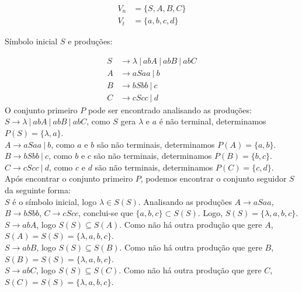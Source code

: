 \documentclass{article}
\begin{document}
\begin{align*}
    V_n &= \{S, A, B, C\}\\
    V_t &= \{a, b, c, d\}
\end{align*}

\noindent Símbolo inicial $S$ e produções:

\begin{align*}
    S &\rightarrow \lambda\ |\ abA\ |\ abB\ |\ abC\\
    A &\rightarrow aSaa\ |\ b\\
    B &\rightarrow bSbb\ |\ c\\
    C &\rightarrow cScc\ |\ d
\end{align*}
O conjunto primeiro $P$ pode ser encontrado analisando as produções:\\
$S \rightarrow \lambda\ |\ abA\ |\ abB\ |\ abC$, como $S$ gera $\lambda$ e $a$ é não terminal, determinamos $P(S) = \{\lambda, a\}$.\\
$A \rightarrow aSaa\ |\ b$, como $a$ e $b$ são não terminais, determinamos $P(A) = \{a, b\}$.\\
$B \rightarrow bSbb\ |\ c$, como $b$ e $c$ são não terminais, determinamos $P(B) = \{b, c\}$.\\
$C \rightarrow cScc\ |\ d$, como $c$ e $d$ são não terminais, determinamos $P(C) = \{c, d\}$.\\

Após encontrar o conjunto primeiro $P$, podemos encontrar o conjunto seguidor $S$ da seguinte forma:\\
$S$ é o símbolo inicial, logo $\lambda \in S(S)$. Analisando as produções $A \rightarrow aSaa$, $B \rightarrow bSbb$, $C \rightarrow cScc$, conclui-se que $\{a, b, c\} \subset S(S)$. Logo, $S(S) = \{\lambda, a, b, c\}$.\\
$S \rightarrow abA$, logo $S(S) \subseteq S(A)$. Como não há outra produção que gere $A$, $S(A) = S(S) = \{\lambda, a, b, c\}$.\\
$S \rightarrow abB$, logo $S(S) \subseteq S(B)$. Como não há outra produção que gere $B$, $S(B) = S(S) = \{\lambda, a, b, c\}$.\\
$S \rightarrow abC$, logo $S(S) \subseteq S(C)$. Como não há outra produção que gere $C$, $S(C) = S(S) = \{\lambda, a, b, c\}$.\\
\end{document}

